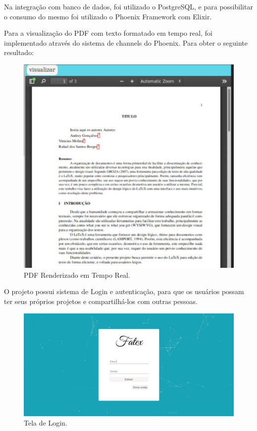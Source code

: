 \documentclass[article,12pt,oneside,a4paper,english,brazil,sumario=tradicional]{abntex2}
\begin{document}
Na integração com banco de dados, foi utilizado o PostgreSQL, e para possibilitar o consumo do mesmo foi utilizado o Phoenix Framework com Elixir.

Para a visualização do PDF com texto formatado em tempo real, foi implementado através do sistema de channels do Phoenix. Para obter o seguinte resultado:


  \begin{figure}[H]
    \centering
    \caption{PDF Renderizado em Tempo Real.}
    \includegraphics[width=15cm]{figures/PDF Render.jpg}
  \end{figure}


O projeto possui sistema de Login e autenticação, para que os usuários possam ter seus próprios projetos e compartilhá-los com outras pessoas.


  \begin{figure}[H]
    \centering
    \caption{Tela de Login.}
    \includegraphics[width=16cm]{figures/Tela Login - FATEX.jpeg}
  \end{figure}
\end{document}

